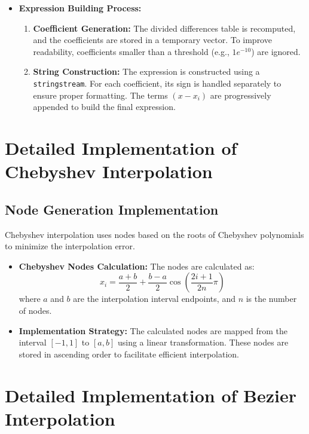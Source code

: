 \documentclass{article}
\begin{document}
\begin{itemize}
    \item \textbf{Expression Building Process:}
    \begin{enumerate}
        \item \textbf{Coefficient Generation:} The divided differences table is recomputed, and the coefficients are stored in a temporary vector. To improve readability, coefficients smaller than a threshold (e.g., \(1e^{-10}\)) are ignored.
        
        \item \textbf{String Construction:} The expression is constructed using a \texttt{stringstream}. For each coefficient, its sign is handled separately to ensure proper formatting. The terms \( (x - x_i) \) are progressively appended to build the final expression.
    \end{enumerate}
\end{itemize}

\section{Detailed Implementation of Chebyshev Interpolation}

\subsection{Node Generation Implementation}
Chebyshev interpolation uses nodes based on the roots of Chebyshev polynomials to minimize the interpolation error.

\begin{itemize}
    \item \textbf{Chebyshev Nodes Calculation:}
    The nodes are calculated as:
    \[
    x_i = \frac{a + b}{2} + \frac{b - a}{2} \cos\left(\frac{2i + 1}{2n} \pi\right)
    \]
    where \(a\) and \(b\) are the interpolation interval endpoints, and \(n\) is the number of nodes.
    
    \item \textbf{Implementation Strategy:}
    The calculated nodes are mapped from the interval \([-1, 1]\) to \([a, b]\) using a linear transformation. These nodes are stored in ascending order to facilitate efficient interpolation.
\end{itemize}

\section{Detailed Implementation of Bezier Interpolation}
\end{document}
